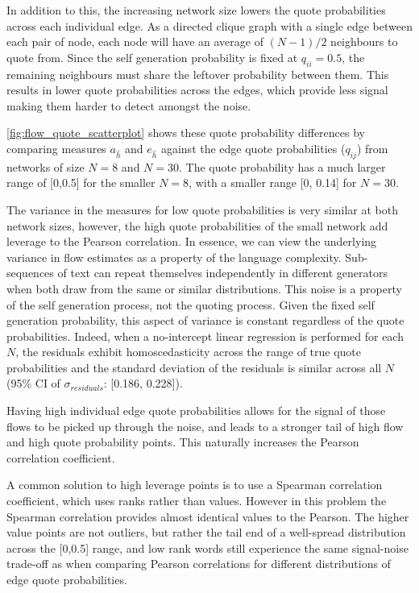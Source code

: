 In addition to this, the increasing network size lowers the quote probabilities across each individual edge. As a directed clique graph with a single edge between each pair of node, each node will have an average of $(N-1)/2$ neighbours to quote from. Since the self generation probability is fixed at $q_{ii}=0.5$, the remaining neighbours must share the leftover probability between them. This results in lower quote probabilities across the edges, which provide less signal making them harder to detect amongst the noise.

\autoref{fig:flow_quote_scatterplot} shows these quote probability differences by comparing measures $a_{\hat{h}}$ and $e_{\hat{h}}$ against the edge quote probabilities ($q_{ij}$) from networks of size $N=8$ and $N=30$. The quote probability has a much larger range of [0,0.5] for the smaller $N=8$, with a smaller range [0, 0.14] for $N=30$.

The variance in the measures for low quote probabilities is very similar at both network sizes, however, the high quote probabilities of the small network add leverage to the Pearson correlation. In essence, we can view the underlying variance in flow estimates as a property of the language complexity. Sub-sequences of text can repeat themselves independently in different generators when both draw from the same or similar distributions. This noise is a property of the self generation process, not the quoting process. Given the fixed self generation probability, this aspect of variance is constant regardless of the quote probabilities.  Indeed, when a no-intercept linear regression is performed for each $N$, the residuals exhibit homoscedasticity across the range of true quote probabilities and the standard deviation of the residuals is similar across all $N$ (95\% CI of $\sigma_{residuals}$: [0.186, 0.228]). 

Having high individual edge quote probabilities allows for the signal of those flows to be picked up through the noise, and leads to a stronger tail of high flow and high quote probability points. This naturally increases the Pearson correlation coefficient.

A common solution to high leverage points is to use a Spearman correlation coefficient, which uses ranks rather than values. However in this problem the Spearman correlation provides almost identical values to the Pearson. The higher value points are not outliers, but rather the tail end of a well-spread distribution across the [0,0.5] range, and low rank words still experience the same signal-noise trade-off as when comparing Pearson correlations for different distributions of edge quote probabilities.


